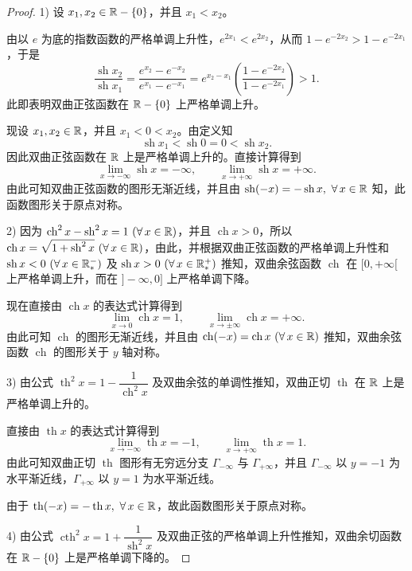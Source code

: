 \begin{proof}

	1) 设 \(x_1,x_2\in\mathbb{R}-\{0\}\)，并且 \(x_1<x_2\)。

	由以 \(e\) 为底的指数函数的严格单调上升性，\(e^{2x_1}<e^{2x_2}\)，从而 \(1-e^{-2x_2}>1-e^{-2x_1}\)，于是
	\[
	\frac{\operatorname{sh}x_2}{\operatorname{sh}x_1}=\frac{e^{x_2}-e^{-x_2}}{e^{x_1}-e^{-x_1}}=e^{x_2-x_1}\left(\frac{1-e^{-2x_2}}{1-e^{-2x_1}}\right)>1.
	\]
	此即表明双曲正弦函数在 \(\mathbb{R}-\{0\}\) 上严格单调上升。

	现设 \(x_1,x_2\in\mathbb{R}\)，并且 \(x_1<0<x_2\)。由定义知
	\[
	\operatorname{sh}x_1<\operatorname{sh}0=0<\operatorname{sh}x_2.
	\]
	因此双曲正弦函数在 \(\mathbb{R}\) 上是严格单调上升的。直接计算得到
	\[
	\lim_{x\to-\infty}\operatorname{sh}x=-\infty,\qquad\lim_{x\to+\infty}\operatorname{sh}x=+\infty.
	\]
	由此可知双曲正弦函数的图形无渐近线，并且由 \(\operatorname{sh}(-x)=-\operatorname{sh}x,\ \forall\,x\in\R\) 知，此函数图形关于原点对称。

	2) 因为 \(\operatorname{ch}^2x-\operatorname{sh}^2x=1\ (\forall\,x\in\R)\)，并且 \(\operatorname{ch}x>0\)，所以 \(\operatorname{ch}x=\sqrt{1+\operatorname{sh}^2x}\ (\forall\,x\in\R)\)，由此，并根据双曲正弦函数的严格单调上升性和 \(\operatorname{sh}x<0\ (\forall\,x\in\R_*^-)\) 及 \(\operatorname{sh}x>0\ (\forall\,x\in\R_*^+)\) 推知，双曲余弦函数 \(\operatorname{ch}\) 在 \([0,+\infty[\) 上严格单调上升，而在 \(]-\infty,0]\) 上严格单调下降。

	现在直接由 \(\operatorname{ch}x\) 的表达式计算得到
	\[
	\lim_{x\to0}\operatorname{ch}x=1,\qquad\lim_{x\to\pm\infty}\operatorname{ch}x=+\infty.
	\]
	由此可知 \(\operatorname{ch}\) 的图形无渐近线，并且由 \(\operatorname{ch}(-x)=\operatorname{ch}x\ (\forall\,x\in\R)\) 推知，双曲余弦函数 \(\operatorname{ch}\) 的图形关于 \(y\) 轴对称。

	3) 由公式 \(\operatorname{th}^2x=1-\dfrac1{\operatorname{ch}^2x}\) 及双曲余弦的单调性推知，双曲正切 \(\operatorname{th}\) 在 \(\mathbb{R}\) 上是严格单调上升的。

	直接由 \(\operatorname{th}x\) 的表达式计算得到
	\[
	\lim_{x\to-\infty}\operatorname{th}x=-1,\qquad\lim_{x\to+\infty}\operatorname{th}x=1.
	\]
	由此可知双曲正切 \(\operatorname{th}\) 图形有无穷远分支 \(\Gamma_{-\infty}\) 与 \(\Gamma_{+\infty}\)，并且 \(\Gamma_{-\infty}\) 以 \(y=-1\) 为水平渐近线，\(\Gamma_{+\infty}\) 以 \(y=1\) 为水平渐近线。

	由于 \(\operatorname{th}(-x)=-\operatorname{th}x,\ \forall\,x\in\R\)，故此函数图形关于原点对称。

	4) 由公式 \(\operatorname{cth}^2x=1+\dfrac1{\operatorname{sh}^2x}\) 及双曲正弦的严格单调上升性推知，双曲余切函数在 \(\mathbb{R}-\{0\}\) 上是严格单调下降的。


\end{proof}
